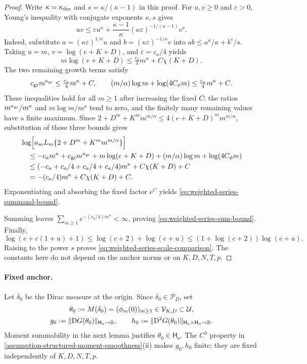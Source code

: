 \begin{proof}
Write $\kappa=\kappa_{\rm dec}$ and $s=\kappa/(\kappa-1)$ in this proof.
For $u,v\ge0$ and $\varepsilon>0$, Young's inequality with conjugate
exponents $\kappa,s$ gives
\begin{equation}
\label{eq:young-weighted-series}
 uv\le\varepsilon u^\kappa+
       \frac{\kappa-1}{\kappa}(\kappa\varepsilon)^{-1/(\kappa-1)}v^s.
\end{equation}
Indeed, substitute $a=(\kappa\varepsilon)^{1/\kappa}u$ and
$b=(\kappa\varepsilon)^{-1/\kappa}v$ into
$ab\le a^\kappa/\kappa+b^s/s$.
Taking $u=m$, $v=\log(e+K+D)$, and $\varepsilon=c_a/4$ yields
\[
 m\log(e+K+D)\le\tfrac{c_a}{4}m^\kappa+C\chi(K+D).
\]
The two remaining growth terms satisfy
\[
 c_{\rm gr}m^{\kappa_{\rm gr}}\le\tfrac{c_a}{4}m^\kappa+C,
 \qquad (m/\alpha)\log m+\log(4C_\phi m)
                  \le\tfrac{c_a}{4}m^\kappa+C.
\]
These inequalities hold for all $m\ge1$ after increasing the fixed $C$:
the ratios $m^{\kappa_{\rm gr}}/m^\kappa$ and
$m\log m/m^\kappa$ tend to zero, and the finitely many remaining values
have a finite maximum.
Since
$2+D^m+K^m m^{m/\alpha}\le4(e+K+D)^m m^{m/\alpha}$, substitution of
these three bounds gives
\[
\begin{aligned}
 &\log\!\left[a_mL_m\{2+D^m+K^m m^{m/\alpha}\}\right]\\
 &\quad\le-c_am^\kappa+c_{\rm gr}m^{\kappa_{\rm gr}}
       +m\log(e+K+D)+(m/\alpha)\log m+\log(4C_\phi m)\\
 &\quad\le(-c_a+c_a/4+c_a/4+c_a/4)m^\kappa+C\chi(K+D)+C\\
 &\quad=-(c_a/4)m^\kappa+C\chi(K+D)+C.
\end{aligned}
\]
Exponentiating and absorbing the fixed factor $e^C$ yields
\eqref{eq:weighted-series-summand-bound}.

Summing leaves $\sum_{m\ge1}e^{-(c_a/4)m^\kappa}<\infty$, proving
\eqref{eq:weighted-series-sum-bound}. Finally,
\[
 \log(e+c(1+u)+1)\le\log(c+2)+\log(e+u)
 \le(1+\log(c+2))\log(e+u).
\]
Raising to the power $s$ proves \eqref{eq:weighted-series-scale-comparison}.
The constants here do not depend on the anchor norms or on $K,D,N,T,p$.
\end{proof}

\paragraph{Fixed anchor.}
Let $\delta_0$ be the Dirac measure at the origin. Since
$\delta_0\in\mathcal P_D$, set
\begin{equation}
\label{eq:moment-anchor}
\begin{gathered}
 \theta_0:=M(\delta_0)=(\phi_m(0))_{m\ge1}\in\mathcal V_{K,D}\subset\mathcal U,\\
 g_0:=\|\mathrm{D} G(\theta_0)\|_{\mathsf H_a\to\mathbb R},\qquad
 h_0:=\|\mathrm{D}^2G(\theta_0)\|_{\mathsf H_a\times\mathsf H_a\to\mathbb R}.
\end{gathered}
\end{equation}
Moment summability in the next lemma justifies $\theta_0\in\mathsf H_a$.
The $C^3$ property in \cref{assumption-structured-moment-smoothness}(ii)
makes $g_0,h_0$ finite; they are fixed independently of $K,D,N,T,p$.

